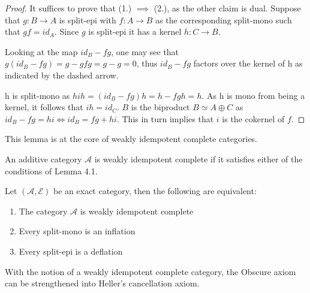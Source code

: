     \begin{proof}
        It suffices to prove that (1.) $\implies$ (2.), as the other claim is dual. Suppose that $g:B\rightarrow A$ is split-epi with $f:A\rightarrow B$ as the corresponding split-mono such that $gf=id_A$. Since $g$ is split-epi it has a kernel $h:C\rightarrow B$.
        
        \begin{center}
        \end{center}

        Looking at the map $id_B-fg$, one may see that $g(id_B-fg)=g-gfg=g-g=0$, thus $id_B-fg$ factors over the kernel of h as indicated by the dashed arrow.

        h is split-mono as $hih = (id_B-fg)h=h-fgh=h$. As h is mono from being a kernel, it follows that $ih=id_C$. $B$ is the biproduct $B\simeq A\oplus C$ as $id_B -fg = hi \iff id_B = fg + hi$. This in turn implies that $i$ is the cokernel of $f$.
    \end{proof}

    This lemma is at the core of weakly idempotent complete categories.

    \begin{definition}
        An additive category $\mathcal{A}$ is weakly idempotent complete if it satisfies either of the conditions of Lemma 4.1.
    \end{definition}

    \begin{corollary}
        Let $(\mathcal{A},\mathcal{E})$ be an exact category, then the following are equivalent:
        \begin{enumerate}
            \item The category $\mathcal{A}$ is weakly idempotent complete
            \item Every split-mono is an inflation
            \item Every split-epi is a deflation
        \end{enumerate}
    \end{corollary}

    With the notion of a weakly idempotent complete category, the Obscure axiom can be strengthened into Heller's cancellation axiom.

